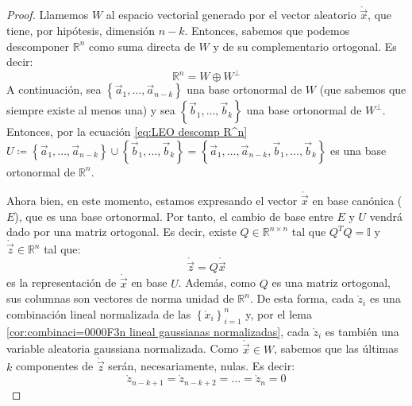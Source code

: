 \documentclass[11pt,a4paper,spanish]{article}
\numberwithin{equation}{section}
\numberwithin{table}{section}
\numberwithin{figure}{section}
\theoremstyle{definition}
\theoremstyle{remark}
\theoremstyle{definition}
\theoremstyle{remark}
\theoremstyle{plain}
\theoremstyle{plain}
\theoremstyle{plain}
\theoremstyle{plain}
\theoremstyle{plain}
\theoremstyle{plain}
\begin{document}
	\begin{proof}
		Llamemos $W$ al espacio vectorial generado por el vector aleatorio
		$\mathring{\vec{x}}$, que tiene, por hipótesis, dimensión $n-k$.
		Entonces, sabemos que podemos descomponer $\mathbb{R}^{n}$ como suma
		directa de $W$ y de su complementario ortogonal. Es decir:
		\begin{equation}
			\mathbb{R}^{n}=W\oplus W^{\perp}\label{eq:LEO descomp R^n}
		\end{equation}
		A continuación, sea $\left\{ \vec{a}_{1},\dots,\vec{a}_{n-k}\right\} $
		una base ortonormal de $W$ (que sabemos que siempre existe al menos
		una) y sea $\left\{ \vec{b}_{1},\dots,\vec{b}_{k}\right\} $ una base
		ortonormal de $W^{\perp}$. Entonces, por la ecuación \vref{eq:LEO descomp R^n}
		$U\coloneqq\left\{ \vec{a}_{1},\dots,\vec{a}_{n-k}\right\} \cup\left\{ \vec{b}_{1},\dots,\vec{b}_{k}\right\} =\left\{ \vec{a}_{1},\dots,\vec{a}_{n-k},\vec{b}_{1},\dots,\vec{b}_{k}\right\} $
		es una base ortonormal de $\mathbb{R}^{n}$.
		
		Ahora bien, en este momento, estamos expresando el vector $\mathring{\vec{x}}$
		en base canónica ($E$), que es una base ortonormal. Por tanto, el
		cambio de base entre $E$ y $U$ vendrá dado por una matriz ortogonal.
		Es decir, existe $Q\in\mathbb{R}^{n\times n}$ tal que $Q^{T}Q=\mathbb{I}$
		y $\mathring{\vec{z}}\in\mathbb{R}^{n}$ tal que:
		\begin{equation}
			\mathring{\vec{z}}=Q\mathring{\vec{x}}\label{eq:LEO z}
		\end{equation}
		es la representación de $\mathring{\vec{x}}$ en base $U$. Además,
		como $Q$ es una matriz ortogonal, sus columnas son vectores de norma
		unidad de $\mathbb{R}^{n}$. De esta forma, cada $\mathring{z}_{i}$
		es una combinación lineal normalizada de las $\left\{ \mathring{x}_{i}\right\} _{i=1}^{n}$
		y, por el lema \vref{cor:combinaci=0000F3n lineal gaussianas normalizadas},
		cada $\mathring{z}_{i}$ es también una variable aleatoria gaussiana
		normalizada. Como $\mathring{\vec{x}}\in W$, sabemos que las últimas
		$k$ componentes de $\mathring{\vec{z}}$ serán, necesariamente, nulas.
		Es decir:
		\begin{equation}
			\mathring{z}_{n-k+1}=\mathring{z}_{n-k+2}=\dots=\mathring{z}_{n}=0\label{eq:LEO zetas nulos}
		\end{equation}
		

\end{proof}
\end{document}
